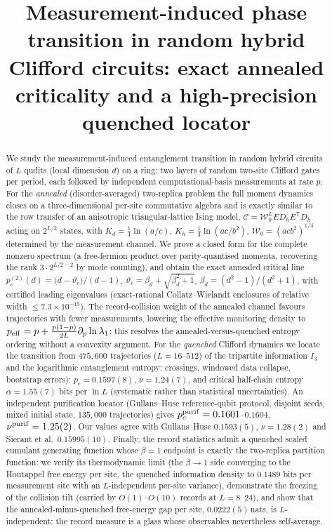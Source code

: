 \documentclass[11pt]{article}
\title{Measurement-induced phase transition in random hybrid Clifford circuits:
exact annealed criticality and a high-precision quenched locator}
\author{}
\date{}
\newcommand{\pctwo}{p_c^{(2)}}
\newcommand{\vth}{\vartheta}
\newcommand{\Ccomp}{\mathcal{C}}
\newcommand{\Wz}{\mathcal{W}_0}
\begin{document}
\maketitle

\begin{abstract}
We study the measurement-induced entanglement transition in random hybrid
circuits of $L$ qudits (local dimension $d$) on a ring: two layers of random
two-site Clifford gates per period, each followed by independent
computational-basis measurements at rate $p$.  For the \emph{annealed}
(disorder-averaged) two-replica problem the full moment dynamics closes on a
three-dimensional per-site commutative algebra and is exactly similar to the
row transfer of an anisotropic triangular-lattice Ising model,
$\Ccomp=\Wz^L E D_h E^{\mathsf T}D_h$ acting on $2^{L/2}$ states, with
$K_d=\tfrac14\ln(a/c)$, $K_h=\tfrac14\ln(ac/b^2)$, $\Wz=(acb^2)^{1/4}$
determined by the measurement channel.  We prove a closed form for the
complete nonzero spectrum (a free-fermion product over parity-quantised
momenta, recovering the rank $3\cdot2^{L/2-2}$ by mode counting), and obtain
the exact annealed critical line
$\pctwo(d)=\bigl(d-\vth_c\bigr)/(d-1)$, $\vth_c=\beta_d+\sqrt{\beta_d^2+1}$,
$\beta_d=(d^2-1)/(d^2+1)$, with certified leading eigenvalues (exact-rational
Collatz--Wielandt enclosures of relative width $\le7.3\times10^{-15}$).
The record-collision weight of the annealed channel favours trajectories with
fewer measurements, lowering the effective monitoring density to
$p_{\rm eff}=p+\tfrac{p(1-p)}{2L}\partial_p\ln\lambda_1$; this resolves the
annealed-versus-quenched entropy ordering without a convexity argument.
For the \emph{quenched} Clifford dynamics we locate the transition from
$475{,}600$ trajectories ($L=16$--$512$) of the tripartite information
$I_3$ and the logarithmic entanglement entropy: crossings, windowed data
collapse, bootstrap errors): $p_c=0.1597(8)$, $\nu=1.24(7)$, and critical
half-chain entropy $\alpha=1.55(7)$ bits per $\ln L$ (systematic rather than
statistical uncertainties).  An independent purification locator
(Gullans--Huse reference-qubit protocol, disjoint seeds, mixed initial state,
$135{,}000$ trajectories) gives $p_c^{\rm purif}=0.1601$--$0.1604$,
$\nu^{\rm purif}=1.25(2)$.  Our values agree with Gullans--Huse
$0.1593(5)$, $\nu=1.28(2)$ and Sierant et al.\ $0.15995(10)$.
Finally, the record statistics admit a quenched scaled cumulant generating
function whose $\beta=1$ endpoint is exactly the two-replica partition
function: we verify its thermodynamic limit (the $\beta\to1$ side converging
to the Houtappel free energy per site, the quenched information density to
$0.1489$ bits per measurement site with an $L$-independent per-site
variance), demonstrate the freezing of the collision tilt (carried by
$O(1)$--$O(10)$ records at $L=8$--$24$), and show that the
annealed-minus-quenched free-energy gap per site,
$0.0222(5)$\,nats, is $L$-independent: the record measure is a glass whose
observables nevertheless self-average.
\end{abstract}
\end{document}
